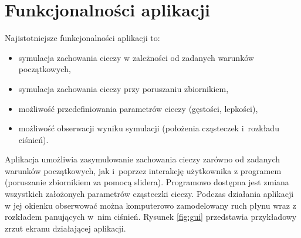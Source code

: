 
\section{Funkcjonalności aplikacji}
Najistotniejsze funkcjonalności aplikacji to:
\begin{itemize}
    \item symulacja zachowania cieczy w zależności od zadanych warunków początkowych,
    \item symulacja zachowania cieczy przy poruszaniu zbiornikiem,
    \item możliwość przedefiniowania parametrów cieczy (gęstości, lepkości),
    \item możliwość obserwacji wyniku symulacji (położenia cząsteczek i~rozkładu ciśnień).
\end{itemize}

Aplikacja umożliwia zasymulowanie zachowania cieczy zarówno od zadanych warunków początkowych, jak i~poprzez interakcję użytkownika z programem (poruszanie zbiornikiem za pomocą slidera). Programowo dostępna jest zmiana wszystkich założonych parametrów cząsteczki cieczy. Podczas działania aplikacji w jej okienku obserwować można komputerowo zamodelowany ruch płynu wraz z rozkładem panujących w~nim ciśnień. Rysunek \ref{fig:gui} przedstawia przykładowy zrzut ekranu działającej aplikacji.